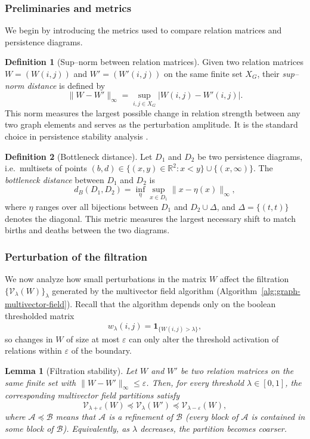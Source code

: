 \documentclass{article}
\theoremstyle{definition}
\newtheorem{definition}{Definition}
\theoremstyle{plain}
\newtheorem{lemma}{Lemma}
\theoremstyle{remark}
\newcommand{\1}{\mathbbm{1}}  %
\begin{document}
\subsubsection{Preliminaries and metrics}

We begin by introducing the metrics used to compare relation matrices and
persistence diagrams.

\begin{definition}[Sup--norm between relation matrices]
Given two relation matrices $W=(W(i,j))$ and $W'=(W'(i,j))$ on the same
finite set $X_G$, their \emph{sup--norm distance} is defined by
\[
\|W-W'\|_\infty = \sup_{i,j\in X_G} |W(i,j)-W'(i,j)|.
\]
This norm measures the largest possible change in relation strength
between any two graph elements and serves as the perturbation amplitude.
It is the standard choice in persistence stability analysis
\cite{cohen2005stability,chazal2016structure}.
\end{definition}

\begin{definition}[Bottleneck distance]
Let $D_1$ and $D_2$ be two persistence diagrams, i.e.\ multisets of
points $(b,d)\in\{(x,y)\in\mathbb R^2:x<y\}\cup\{(x,\infty)\}$.
The \emph{bottleneck distance} between $D_1$ and $D_2$ is
\[
d_B(D_1,D_2)
  = \inf_{\eta}
     \sup_{x\in D_1}
     \|x-\eta(x)\|_\infty,
\]
where $\eta$ ranges over all bijections between $D_1$ and
$D_2\cup\Delta$, and $\Delta=\{(t,t)\}$ denotes the diagonal.
This metric measures the largest necessary shift to match births and
deaths between the two diagrams.
\end{definition}

\subsubsection{Perturbation of the filtration}

We now analyze how small perturbations in the matrix $W$ affect the
filtration $\{\mathcal V_\lambda(W)\}_\lambda$ generated by the
multivector field algorithm (Algorithm~\ref{alg:graph-multivector-field}).
Recall that the algorithm depends only on the boolean thresholded matrix
\[
w_\lambda(i,j) = \mathbf{1}_{\{W(i,j) > \lambda\}},
\]
so changes in $W$ of size at most $\varepsilon$ can only alter the
threshold activation of relations within $\varepsilon$ of the boundary.\begin{lemma}[Filtration stability]
\label{lem:filtration_stability}
Let $W$ and $W'$ be two relation matrices on the same finite set
with $\|W - W'\|_\infty \le \varepsilon$.  
Then, for every threshold $\lambda \in [0,1]$, the corresponding
multivector field partitions satisfy
\[
\mathcal V_{\lambda+\varepsilon}(W)
  \preceq
\mathcal V_{\lambda}(W')
  \preceq
\mathcal V_{\lambda-\varepsilon}(W),
\]
where $\mathcal A \preceq \mathcal B$ means that
$\mathcal A$ is a \emph{refinement} of $\mathcal B$
(every block of $\mathcal A$ is contained in some block of $\mathcal B$).
Equivalently, as $\lambda$ decreases, the partition becomes coarser.
\end{lemma}
\end{document}
